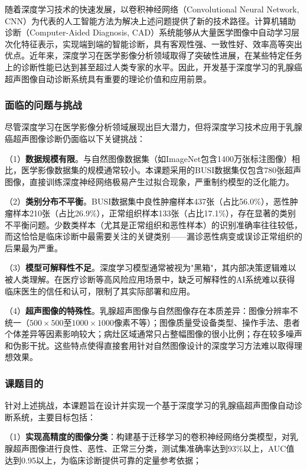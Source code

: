 随着深度学习技术的快速发展，以卷积神经网络（Convolutional Neural Network, CNN）为代表的人工智能方法为解决上述问题提供了新的技术路径。计算机辅助诊断（Computer-Aided Diagnosis, CAD）系统能够从大量医学图像中自动学习层次化特征表示，实现端到端的智能诊断，具有客观性强、一致性好、效率高等突出优点。近年来，深度学习在医学影像分析领域取得了突破性进展，在某些特定任务上的诊断性能已达到甚至超过人类专家的水平\cite{esteva2017dermatologist}。因此，开发基于深度学习的乳腺癌超声图像自动诊断系统具有重要的理论价值和应用前景。

\subsubsection{面临的问题与挑战}

尽管深度学习在医学影像分析领域展现出巨大潜力，但将深度学习技术应用于乳腺癌超声图像诊断仍面临以下关键挑战：

（1）\textbf{数据规模有限}。与自然图像数据集（如ImageNet包含1400万张标注图像）相比，医学影像数据集的规模通常较小。本课题采用的BUSI数据集仅包含780张超声图像，直接训练深度神经网络极易产生过拟合现象，严重制约模型的泛化能力。

（2）\textbf{类别分布不平衡}。BUSI数据集中良性肿瘤样本437张（占比56.0\%），恶性肿瘤样本210张（占比26.9\%），正常组织样本133张（占比17.1\%），存在显著的类别不平衡问题。少数类样本（尤其是正常组织和恶性样本）的识别准确率往往较低，而这恰恰是临床诊断中最需要关注的关键类别——漏诊恶性病变或误诊正常组织的后果最为严重。

（3）\textbf{模型可解释性不足}。深度学习模型通常被视为"黑箱"，其内部决策逻辑难以被人类理解。在医疗诊断等高风险应用场景中，缺乏可解释性的AI系统难以获得临床医生的信任和认可，限制了其实际部署和应用。

（4）\textbf{超声图像的特殊性}。乳腺超声图像与自然图像存在本质差异：图像分辨率不统一（$500\times500$至$1000\times1000$像素不等）；图像质量受设备类型、操作手法、患者个体差异等因素影响较大；病灶区域通常只占整幅图像的很小比例；存在较多噪声和伪影干扰。这些特点使得直接套用针对自然图像设计的深度学习方法难以取得理想效果。

\subsubsection{课题目的}

针对上述挑战，本课题旨在设计并实现一个基于深度学习的乳腺癌超声图像自动诊断系统，主要目标包括：

（1）\textbf{实现高精度的图像分类}：构建基于迁移学习的卷积神经网络分类模型，对乳腺超声图像进行良性、恶性、正常三分类，测试集准确率达到93\%以上，AUC值达到0.95以上，为临床诊断提供可靠的定量参考依据；

